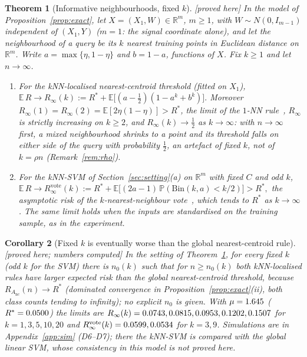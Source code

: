 \documentclass[11pt,a4paper]{article}
\theoremstyle{plain}
\newtheorem{theorem}{Theorem}[section]
\newtheorem{corollary}[theorem]{Corollary}
\theoremstyle{definition}
\theoremstyle{remark}
\newcommand{\R}{\mathbb{R}}
\newcommand{\E}{\mathbb{E}}
\newcommand{\Prob}{\mathbb{P}}
\newcommand{\Risk}{R}
\newcommand{\status}[1]{\textsf{\small [#1]}}
\begin{document}
\begin{theorem}[Informative neighbourhoods, fixed $k$]\label{thm:kfixed}\status{proved here}
In the model of Proposition~\ref{prop:exact}, let $X=(X_1,W)\in\R^m$, $m\ge1$, with $W\sim N(0,I_{m-1})$ independent of $(X_1,Y)$ ($m=1$: the signal coordinate alone), and let the neighbourhood of a query be its $k$ nearest training points in Euclidean distance on $\R^m$. Write $a=\max\{\eta,1-\eta\}$ and $b=1-a$, functions of $X$. Fix $k\ge1$ and let $n\to\infty$.
\begin{enumerate}[leftmargin=2em,label=(\roman*),itemsep=1pt]
\item For the kNN-localised nearest-centroid threshold (fitted on $X_1$),
\(
\E\,\Risk\to\Risk_\infty(k):=\Risk^*+\E\bigl[(a-\tfrac12)(1-a^k+b^k)\bigr].
\)
Moreover $\Risk_\infty(1)=\Risk_\infty(2)=\E[2\eta(1-\eta)]>\Risk^*$, the limit of the $1$-NN rule~\citep{cover1967}, $\Risk_\infty$ is strictly increasing on $k\ge2$, and $\Risk_\infty(k)\to\tfrac12$ as $k\to\infty$: with $n\to\infty$ first, a mixed neighbourhood shrinks to a point and its threshold falls on either side of the query with probability $\tfrac12$, an artefact of fixed $k$, not of $k=\rho n$ (Remark~\ref{rem:rho}).
\item For the kNN-SVM of Section~\ref{sec:setting}(a) on $\R^m$ with fixed $C$ and odd $k$,
\(
\E\,\Risk\to\Risk^{\mathrm{vote}}_\infty(k):=\Risk^*+\E\bigl[(2a-1)\,\Prob(\mathrm{Bin}(k,a)<k/2)\bigr]>\Risk^*,
\)
the asymptotic risk of the $k$-nearest-neighbour vote~\citep{cover1967,devroye1996}, which tends to $\Risk^*$ as $k\to\infty$. The same limit holds when the inputs are standardised on the training sample, as in the experiment.
\end{enumerate}
\end{theorem}

\begin{corollary}[Fixed $k$ is eventually worse than the global nearest-centroid rule]\label{cor:kfixed}\status{proved here; numbers computed}
In the setting of Theorem~\ref{thm:kfixed}, for every fixed $k$ (odd $k$ for the SVM) there is $n_0(k)$ such that for $n\ge n_0(k)$ both kNN-localised rules have larger expected risk than the global nearest-centroid threshold, because $\Risk_{A_{\mathrm{nc}}}(n)\to\Risk^*$ (dominated convergence in Proposition~\ref{prop:exact}(ii), both class counts tending to infinity); no explicit $n_0$ is given. With $\mu=1.645$ ($\Risk^*=\ExBayes$) the limits are $\Risk_\infty(k)=\KLLimNcOne,\KLLimNcThree,\KLLimNcFive,\KLLimNcTen,\KLLimNcTwenty$ for $k=1,3,5,10,20$ and $\Risk^{\mathrm{vote}}_\infty(k)=\KLLimVoteThree,\KLLimVoteNine$ for $k=3,9$. Simulations are in Appendix~\ref{app:sim} (D6--D7); there the kNN-SVM is compared with the global linear SVM, whose consistency in this model is not proved here.
\end{corollary}
\end{document}
